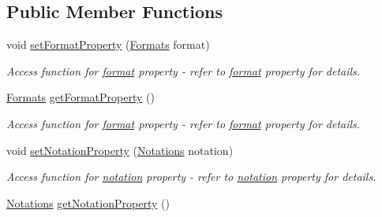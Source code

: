 \subsection*{Public Member Functions}
\begin{DoxyCompactItemize}
\item 
\hypertarget{classQELineEdit_a32850f0987afbc228738cd9aaa42652f}{
void \hyperlink{classQELineEdit_a32850f0987afbc228738cd9aaa42652f}{setFormatProperty} (\hyperlink{classQELineEdit_aaf6d4da2e751180b9fc82e80d506812a}{Formats} format)}
\label{classQELineEdit_a32850f0987afbc228738cd9aaa42652f}

\begin{DoxyCompactList}\small\item\em Access function for \hyperlink{classQELineEdit_a898821256a4bab25580a3007fffa44c2}{format} property -\/ refer to \hyperlink{classQELineEdit_a898821256a4bab25580a3007fffa44c2}{format} property for details. \end{DoxyCompactList}\item 
\hypertarget{classQELineEdit_af1ca1d05a9392287afc64ed60aa311e3}{
\hyperlink{classQELineEdit_aaf6d4da2e751180b9fc82e80d506812a}{Formats} \hyperlink{classQELineEdit_af1ca1d05a9392287afc64ed60aa311e3}{getFormatProperty} ()}
\label{classQELineEdit_af1ca1d05a9392287afc64ed60aa311e3}

\begin{DoxyCompactList}\small\item\em Access function for \hyperlink{classQELineEdit_a898821256a4bab25580a3007fffa44c2}{format} property -\/ refer to \hyperlink{classQELineEdit_a898821256a4bab25580a3007fffa44c2}{format} property for details. \end{DoxyCompactList}\item 
\hypertarget{classQELineEdit_ae1c4241adedde05d7d914b387f1975bc}{
void \hyperlink{classQELineEdit_ae1c4241adedde05d7d914b387f1975bc}{setNotationProperty} (\hyperlink{classQELineEdit_a8037a63e14b30d7fce853e4d32156c14}{Notations} notation)}
\label{classQELineEdit_ae1c4241adedde05d7d914b387f1975bc}

\begin{DoxyCompactList}\small\item\em Access function for \hyperlink{classQELineEdit_a496e07607a7a0b46c8d176fb627526fb}{notation} property -\/ refer to \hyperlink{classQELineEdit_a496e07607a7a0b46c8d176fb627526fb}{notation} property for details. \end{DoxyCompactList}\item 
\hypertarget{classQELineEdit_af9333bd9689d5a3e985510de51739bad}{
\hyperlink{classQELineEdit_a8037a63e14b30d7fce853e4d32156c14}{Notations} \hyperlink{classQELineEdit_af9333bd9689d5a3e985510de51739bad}{getNotationProperty} ()}
\label{classQELineEdit_af9333bd9689d5a3e985510de51739bad}


\end{DoxyCompactItemize}

